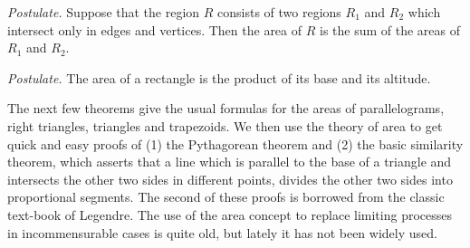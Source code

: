 \textit{Postulate.} Suppose that the region $R$ consists of two
regions $R_1$ and $R_2$ which intersect only in edges and
vertices. Then the area of $R$ is the sum of the areas of $R_1$ and $R_2$.

\textit{Postulate.} The area of a  rectangle is the product of its
base and its altitude. 

The next few theorems give the usual formulas for the areas of
parallelograms, right triangles, triangles and trapezoids. We then use
the theory of area to get quick and easy proofs of (1) the Pythagorean
theorem and (2) the basic similarity theorem, which asserts that a
line which is parallel to the base of a triangle and intersects the
other two sides in different points, divides the other two sides into
proportional segments. The second of these proofs is borrowed from the
classic text-book of Legendre. The use of the area concept to replace
limiting processes in incommensurable cases is quite old, but lately
it has not been widely used.

